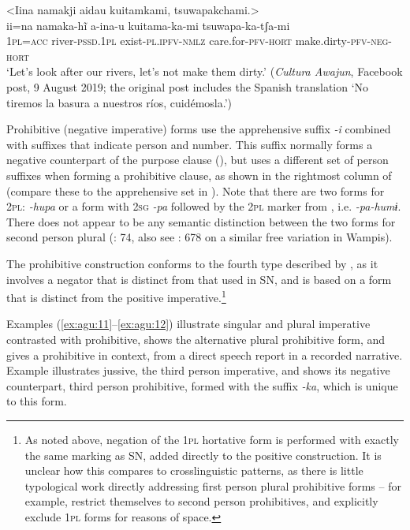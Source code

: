 \documentclass[output=paper,colorlinks,citecolor=brown,draft]{langscibook}
\begin{document}
\ea\label{ex:agu:10}
    \glll <Iina namakji aidau kuitamkami, tsuwapakchami.> \\ 
          ii=na  namaka-hĩ  a-ina-u  kuitama-ka-mi tsuwapa-ka-tʃa-mi \\
          \textsc{1pl}=\textsc{acc}  river-\textsc{pssd.1pl}  exist-\textsc{pl.ipfv-nmlz}  care.for-\textsc{pfv-hort} make.dirty-\textsc{pfv-neg-hort}\\
    \glt ‘Let’s look after our rivers, let’s not make them dirty.’ (\textit{Cultura Awajun}, Facebook post, 9 August 2019; the original post includes the Spanish translation ‘{No tiremos la basura a nuestros ríos, cuidémosla}.’)
\z 

Prohibitive (negative imperative) forms use the apprehensive suffix \textit{\nobreakdash-i} combined with suffixes that indicate person and number. This suffix normally forms a negative counterpart of the purpose clause (), but uses a different set of person suffixes when forming a prohibitive clause, as shown in the rightmost column of  (compare these to the apprehensive set in ). Note that there are two forms for \textsc{2pl}: \textit{\nobreakdash-hupa} or a form with \textsc{2sg} \textit{{}-pa} followed by the \textsc{2pl} marker from , i.e. \textit{\nobreakdash-pa-humɨ}. There does not appear to be any semantic distinction between the two forms for second person plural (\citealt{Overall2017b}: 74, also see \citealt{Peña2015}: 678 on a similar free variation in Wampis).

The prohibitive construction conforms to the fourth type described by \citet{AuweraEtAl2013}, as it involves a negator that is distinct from that used in SN, and is based on a form that is distinct from the positive imperative.\footnote{As noted above, negation of the \textsc{1pl} hortative form is performed with exactly the same marking as SN, added directly to the positive construction. It is unclear how this compares to crosslinguistic patterns, as there is little typological work directly addressing first person plural prohibitive forms – for example, \citet{AuweraEtAl2013} restrict themselves to second person prohibitives, and \citet{AuweraKrasnoukhova2020} explicitly exclude \textsc{1pl} forms for reasons of space.}

Examples (\ref{ex:agu:11}--\ref{ex:agu:12}) illustrate singular and plural imperative contrasted with prohibitive,  shows the alternative plural prohibitive form, and  gives a prohibitive in context, from a direct speech report in a recorded narrative. Example  illustrates jussive, the third person imperative, and  shows its negative counterpart, third person prohibitive, formed with the suffix \textit{{}-ka}, which is unique to this form.
\end{document}
